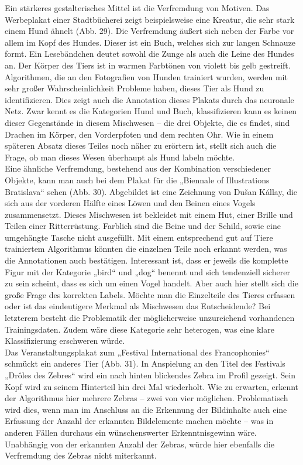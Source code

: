 \documentclass[a4paper,12pt,ngerman]{article}
\begin{document}
Ein stärkeres gestalterisches Mittel ist die Verfremdung von Motiven. Das Werbeplakat einer Stadtbücherei zeigt beispielsweise eine Kreatur, die sehr stark einem Hund ähnelt (Abb. 29). Die Verfremdung äußert sich neben der Farbe vor allem im Kopf des Hundes. Dieser ist ein Buch, welches sich zur langen Schnauze formt. Ein Lesebändchen deutet sowohl die Zunge als auch die Leine des Hundes an. Der Körper des Tiers ist in warmen Farbtönen von violett bis gelb gestreift. Algorithmen, die an den Fotografien von Hunden trainiert wurden, werden mit sehr großer Wahrscheinlichkeit Probleme haben, dieses Tier als Hund zu identifizieren. Dies zeigt auch die Annotation dieses Plakats durch das neuronale Netz. Zwar kennt es die Kategorien Hund und Buch, klassifizieren kann es keinen dieser Gegenstände in diesem Mischwesen -- die drei Objekte, die es findet, sind Drachen im Körper, den Vorderpfoten und dem rechten Ohr. Wie in einem späteren Absatz dieses Teiles noch näher zu erörtern ist, stellt sich auch die Frage, ob man dieses Wesen überhaupt als Hund labeln möchte. \\
Eine ähnliche Verfremdung, bestehend aus der Kombination verschiedener Objekte, kann man auch bei dem Plakat für die „Biennale of Illustrations Bratislava“ sehen (Abb. 30). Abgebildet ist eine Zeichnung von Dušan Kállay, die sich aus der vorderen Hälfte eines Löwen und den Beinen eines Vogels zusammensetzt. Dieses Mischwesen ist bekleidet mit einem Hut, einer Brille und Teilen einer Ritterrüstung. Farblich sind die Beine und der Schild, sowie eine umgehängte Tasche nicht ausgefüllt. Mit einem entsprechend gut auf Tiere trainiertem Algorithmus könnten die einzelnen Teile noch erkannt werden, was die Annotationen auch bestätigen. Interessant ist, dass er jeweils die komplette Figur mit der Kategorie „bird“ und „dog“ benennt und sich tendenziell sicherer zu sein scheint, dass es sich um einen Vogel handelt. Aber auch hier stellt sich die große Frage des korrekten Labels. Möchte man die Einzelteile des Tieres erfassen oder ist das eindeutigere Merkmal als Mischwesen das Entscheidende? Bei letzterem besteht die Problematik der möglicherweise unzureichend vorhandenen Trainingsdaten. Zudem wäre diese Kategorie sehr heterogen, was eine klare Klassifizierung erschweren würde. \\
Das Veranstaltungsplakat zum „Festival International des Francophonies“ schmückt ein anderes Tier (Abb. 31). In Anspielung an den Titel des Festivals „Drôles des Zebres“ wird ein nach hinten blickendes Zebra im Profil gezeigt. Sein Kopf wird zu seinem Hinterteil hin drei Mal wiederholt. Wie zu erwarten, erkennt der Algorithmus hier mehrere Zebras -- zwei von vier möglichen. Problematisch wird dies, wenn man im Anschluss an die Erkennung der Bildinhalte auch eine Erfassung der Anzahl der erkannten Bildelemente machen möchte -- was in anderen Fällen durchaus ein wünschenswerter Erkenntnisgewinn wäre. Unabhängig von der erkannten Anzahl der Zebras, würde hier ebenfalls die Verfremdung des Zebras nicht miterkannt. \\
\end{document}

